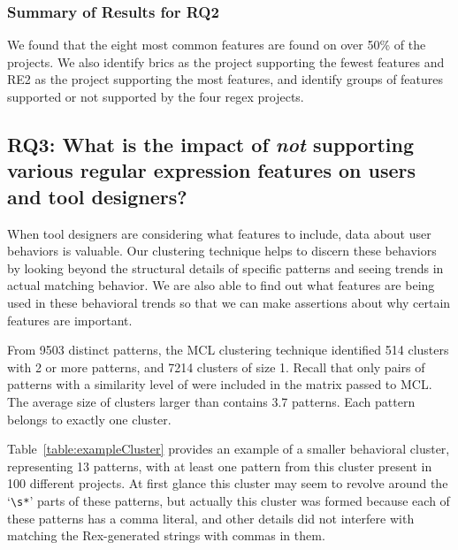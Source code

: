 

\subsubsection{Summary of Results for RQ2}
We found that the eight most common features are found on over 50\% of the projects.
We also identify brics as the project supporting the fewest features and RE2 as the project supporting the most features, and identify groups of features supported or not supported by the four regex projects.


\subsection{{RQ3:} What is the impact of \emph{not} supporting various regular expression features on users and tool designers?}
\label{results:rq3}

When tool designers are considering what features to include, data about user behaviors is valuable.  Our clustering technique helps to discern these behaviors by looking beyond the structural details of specific patterns and seeing trends in actual matching behavior.  We are also able to find out what features are being used in these behavioral trends so that we can make assertions about why certain features are important.

From 9503 distinct patterns, the MCL clustering technique identified 514 clusters with 2 or more patterns, and 7214 clusters of size 1.  Recall that only pairs of patterns with a similarity level of  were included in the matrix passed to MCL.  The average size of clusters larger than contains 3.7 patterns.
Each pattern belongs to exactly one cluster.


Table~\ref{table:exampleCluster} provides an example of a smaller behavioral cluster, representing 13 patterns, with at least one pattern from this cluster present in 100 different projects.  At first glance this cluster may seem to revolve around the `\verb!\s*!' parts of these patterns, but actually this cluster was formed because each of these patterns has a comma literal, and other details did not interfere with matching the Rex-generated strings with commas in them.


